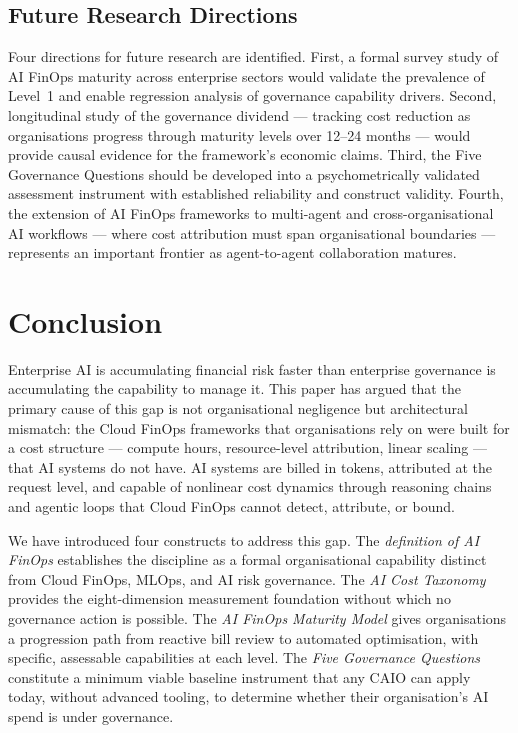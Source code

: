 \documentclass[11pt,twocolumn]{article}
\begin{document}
\subsection{Future Research Directions}

Four directions for future research are identified. First, a formal survey
study of AI FinOps maturity across enterprise sectors would validate the
prevalence of Level~1 and enable regression analysis of governance
capability drivers. Second, longitudinal study of the governance dividend ---
tracking cost reduction as organisations progress through maturity levels
over 12--24 months --- would provide causal evidence for the framework's
economic claims. Third, the Five Governance Questions should be developed
into a psychometrically validated assessment instrument with established
reliability and construct validity. Fourth, the extension of AI FinOps
frameworks to multi-agent and cross-organisational AI workflows --- where
cost attribution must span organisational boundaries --- represents an
important frontier as agent-to-agent collaboration matures.

\section{Conclusion}
\label{sec:conclusion}

Enterprise AI is accumulating financial risk faster than enterprise governance
is accumulating the capability to manage it. This paper has argued that the
primary cause of this gap is not organisational negligence but architectural
mismatch: the Cloud FinOps frameworks that organisations rely on were built
for a cost structure --- compute hours, resource-level attribution, linear
scaling --- that AI systems do not have. AI systems are billed in tokens,
attributed at the request level, and capable of nonlinear cost dynamics
through reasoning chains and agentic loops that Cloud FinOps cannot detect,
attribute, or bound.

We have introduced four constructs to address this gap. The \textit{definition
of AI FinOps} establishes the discipline as a formal organisational capability
distinct from Cloud FinOps, MLOps, and AI risk governance. The \textit{AI Cost
Taxonomy} provides the eight-dimension measurement foundation without which
no governance action is possible. The \textit{AI FinOps Maturity Model} gives
organisations a progression path from reactive bill review to automated
optimisation, with specific, assessable capabilities at each level. The
\textit{Five Governance Questions} constitute a minimum viable baseline
instrument that any CAIO can apply today, without advanced tooling, to
determine whether their organisation's AI spend is under governance.
\end{document}
